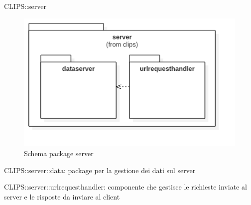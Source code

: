 \begin{componente}{CLIPS::server}
\begin{figure}[h!]
\centering
\includegraphics[scale=0.4]{img/package/png/server.png}
\caption{Schema package server}
 \end{figure}
\begin{compPackageContenuti}
\item CLIPS::server::data: package per la gestione dei dati sul server
\item CLIPS::server::urlrequesthandler: componente che gestisce le richieste inviate al server e le risposte da inviare al client
\end{compPackageContenuti}
\end{componente}
